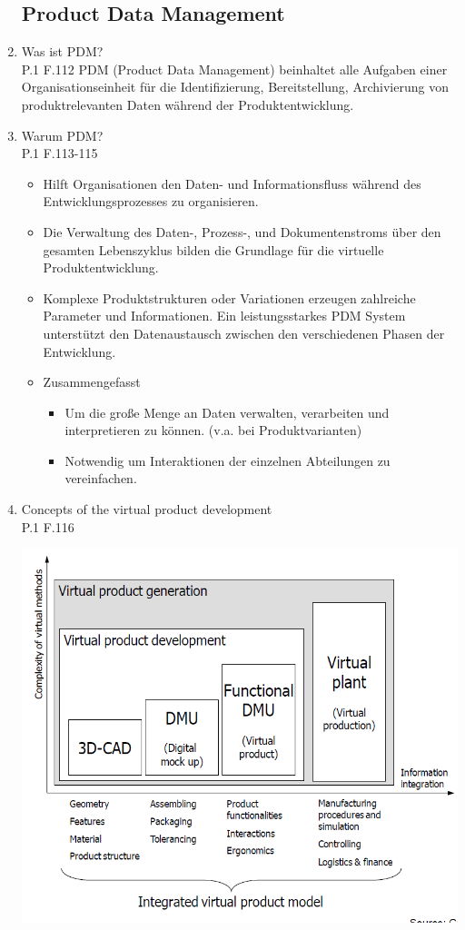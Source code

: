 \documentclass[10pt,a4paper,fleqn]{article}
\begin{document}
\begin{enumerate}
\subsection{Product Data Management}
	\item Was ist PDM?\\
		P.1 F.112
		PDM (Product Data Management) beinhaltet alle Aufgaben einer Organisationseinheit für die Identifizierung, Bereitstellung, Archivierung von produktrelevanten Daten während der Produktentwicklung.
	\item Warum PDM?\\
		P.1 F.113-115
		\begin{itemize}
			\item Hilft Organisationen den Daten- und Informationsfluss während des Entwicklungsprozesses zu organisieren.
			\item Die Verwaltung des Daten-, Prozess-, und Dokumentenstroms über den gesamten Lebenszyklus bilden die Grundlage für die virtuelle Produktentwicklung.
			\item Komplexe Produktstrukturen oder Variationen erzeugen zahlreiche Parameter und Informationen. Ein leistungsstarkes PDM System unterstützt den Datenaustausch zwischen den verschiedenen Phasen der Entwicklung.
			\item Zusammengefasst
				\begin{itemize}
					\item Um die große Menge an Daten verwalten, verarbeiten und interpretieren zu können. (v.a. bei Produktvarianten)
					\item Notwendig um Interaktionen der einzelnen Abteilungen zu vereinfachen.
				\end{itemize}
		\end{itemize}
\pagebreak
	\item Concepts of the virtual product development\\
		P.1 F.116
		\begin{center}
			\includegraphics[scale=0.6]{foo,png}

\end{center}
\end{enumerate}
\end{document}
